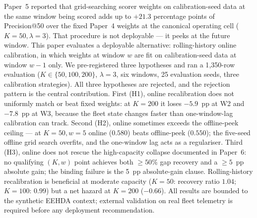 Paper~5 reported that grid-searching scorer weights on calibration-seed
data at the same window being scored adds up to $+21.3$ percentage points
of Precision@50 over the fixed Paper~4 weights at the canonical operating
cell ($K=50, \lambda=3$). That procedure is not deployable --- it peeks
at the future window. This paper evaluates a deployable alternative:
rolling-history online calibration, in which weights at window $w$ are
fit on calibration-seed data at window $w-1$ only. We pre-registered
three hypotheses and ran a 1{,}350-row evaluation
($K \in \{50, 100, 200\}$, $\lambda = 3$, six windows, 25 evaluation
seeds, three calibration strategies). All three hypotheses are rejected,
and the rejection pattern is the central contribution. First (H1),
online recalibration does not uniformly match or beat fixed weights: at
$K = 200$ it loses $-5.9$~pp at W2 and $-7.8$~pp at W3, because the
fleet state changes faster than one-window-lag calibration can track.
Second (H2), online sometimes exceeds the offline-peek ceiling --- at
$K = 50, w = 5$ online ($0.580$) beats offline-peek ($0.550$); the
five-seed offline grid search overfits, and the one-window lag acts as
a regulariser. Third (H3), online does not rescue the high-capacity
collapse documented in Paper~6: no qualifying $(K, w)$ point achieves
both $\geq 50\%$ gap recovery and a $\geq 5$~pp absolute gain; the
binding failure is the 5~pp absolute-gain clause. Rolling-history
recalibration is beneficial at moderate capacity ($K = 50$: recovery
ratio $1.04$; $K = 100$: $0.99$) but a net hazard at $K = 200$
($-0.66$). All results are bounded to the synthetic EEHDA context;
external validation on real fleet telemetry is required before any
deployment recommendation.

